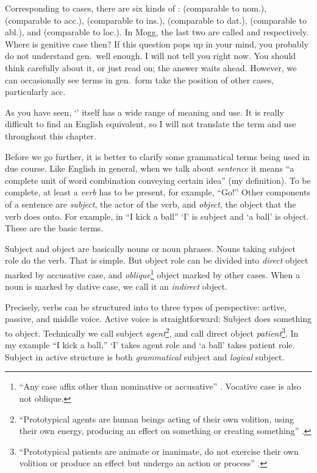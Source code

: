 Corresponding to cases, there are six kinds of :  (comparable to nom.),  (comparable to acc.),  (comparable to ins.),  (comparable to dat.),  (comparable to abl.), and  (comparable to loc.). In Mogg, the last two are called  and  respectively. Where is genitive case then? If this question pops up in your mind, you probably do not understand gen.\ well enough. I will not tell you right now. You should think carefully about it, or just read on; the answer waits ahead. However, we can occasionally see terms in gen.\ form take the position of other cases, particularly acc.

As you have seen, `' itself has a wide range of meaning and use. It is really difficult to find an English equivalent, so I will not translate the term and use  throughout this chapter.

Before we go further, it is better to clarify some grammatical terms being used in due course. Like English in general, when we talk about \emph{sentence} it means ``a complete unit of word combination conveying certain idea'' (my definition). To be complete, at least a \emph{verb} has to be present, for example, ``Go!'' Other components of a sentence are \emph{subject}, the actor of the verb, and \emph{object}, the object that the verb does onto. For example, in ``I kick a ball'' `I' is subject and `a ball' is object. These are the basic terms.

Subject and object are basically nouns or noun phrases. Nouns taking subject role do the verb. That is simple. But object role can be divided into \emph{direct} object marked by accusative case, and \emph{oblique}\footnote{``Any case affix other than nominative or accusative'' \citep[p.~318]{brownmiller:dict}. Vocative case is also not oblique.} object marked by other cases. When a noun is marked by dative case, we call it an \emph{indirect} object.

Precisely, verbs can be structured into to three types of perspective: active, passive, and middle voice. Active voice is straightforward: Subject does something to object. Technically we call subject \emph{agent}\footnote{``Prototypical agents are human beings acting of their own volition, using their own energy, producing an effect on something or creating something'' \citep[p.~387]{brownmiller:dict}.}, and call direct object \emph{patient}\footnote{``Prototypical patients are animate or inanimate, do not exercise their own volition or produce an effect but undergo an action or process'' \citep[p.~387]{brownmiller:dict}.}. In my example ``I kick a ball,'' `I' takes agent role and `a ball' takes patient role. Subject in active structure is both \emph{grammatical} subject and \emph{logical} subject.


